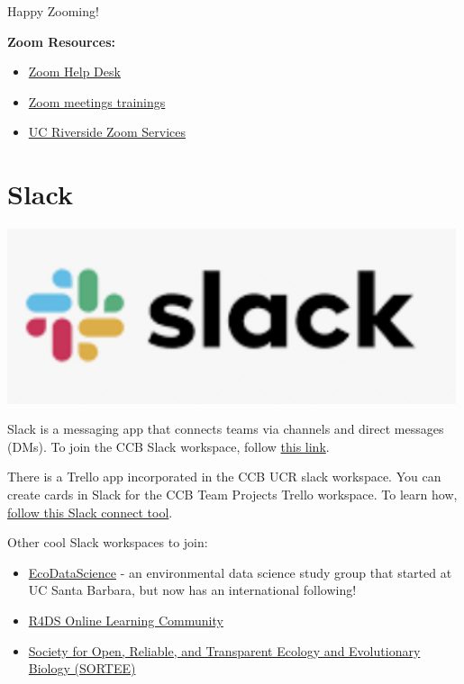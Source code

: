 \documentclass[
]{book}
\providecommand{\tightlist}{%
  \setlength{\itemsep}{0pt}\setlength{\parskip}{0pt}}
\begin{document}
Happy Zooming!

\textbf{Zoom Resources:}

\begin{itemize}
\tightlist
\item
  \href{https://support.zoom.us/hc/en-us}{Zoom Help Desk}
\item
  \href{https://livetraining.zoom.us/rec/play/6Zx8f-j7qDw3GNeQswSDAPJ-W9S4J6qshiYfqfcNyk20WyIHNFChb7pHZuClKrDVR76R1BxgtMF4txaS?continueMode=true}{Zoom meetings trainings}
\item
  \href{https://ucr.zoom.us/}{UC Riverside Zoom Services}
\end{itemize}

\hypertarget{slack}{%
\section{Slack}\label{slack}}

\begin{flushleft}\includegraphics[width=5.19in]{images/slack} \end{flushleft}

Slack is a messaging app that connects teams via channels and direct messages (DMs).
To join the CCB Slack workspace, follow \href{https://join.slack.com/t/ccbucr/shared_invite/zt-1dfpaguqs-F4CAPCI4ILMvT0JOcSpnag}{this link}.

There is a Trello app incorporated in the CCB UCR slack workspace. You can create cards in Slack for the CCB Team Projects Trello workspace. To learn how, \href{https://slack.com/help/articles/231967387-Trello-for-Slack}{follow this Slack connect tool}.

Other cool Slack workspaces to join:

\begin{itemize}
\item
  \href{https://eco-data-science.github.io/}{EcoDataScience} - an environmental data science study group that started at UC Santa Barbara, but now has an international following!
\item
  \href{https://www.rfordatasci.com}{R4DS Online Learning Community}
\item
  \href{https://www.sortee.org}{Society for Open, Reliable, and Transparent Ecology and Evolutionary Biology (SORTEE)}
\end{itemize}
\end{document}
